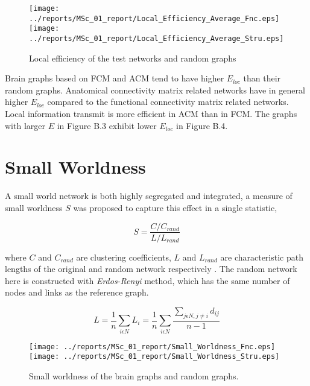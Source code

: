 \begin{figure}[htbp]
 
  \centering
	 \texttt{[image: ../reports/MSc\_01\_report/Local\_Efficiency\_Average\_Fnc.eps]}
	 \texttt{[image: ../reports/MSc\_01\_report/Local\_Efficiency\_Average\_Stru.eps]}
  \caption[Local Efficiency]{Local efficiency of the test networks and random graphs} 
    \label{fig:Local Efficiency}
 	
\end{figure}

Brain graphs based on FCM and ACM tend to have higher $E_{loc}$ than their random graphs. Anatomical connectivity matrix related networks have in general higher $E_{loc}$ compared to the functional connectivity matrix related networks. Local information transmit is more efficient in ACM than in FCM. The graphs with larger $E$ in Figure B.3 exhibit lower $E_{loc}$ in Figure B.4.   


\section{Small Worldness}

A small world network is both highly segregated and integrated, a measure of small worldness $S$ was proposed to capture this effect in a single statistic,

\begin{equation}
S = \frac{C/C_{rand}}{L/L_{rand}}
\end{equation}
 
where $C$ and $C_{rand}$ are clustering coefficients, $L$ and $L_{rand}$ are characteristic path lengths of the original and random network respectively \citep{HUM08}. The random network here is constructed with \textit{Erdos-Renyi} method, which has the same number of nodes and links as the reference graph. 

\begin{equation}
L = \frac{1}{n}\sum\limits_{i \epsilon N} L_i = \frac{1}{n}\sum\limits_{i \epsilon N} \frac{\sum\limits_{j \epsilon N, j \neq i }d_{ij}}{n-1 } 
\end{equation}


\begin{figure}[htbp]
 
  \centering
	 \texttt{[image: ../reports/MSc\_01\_report/Small\_Worldness\_Fnc.eps]}
	 \texttt{[image: ../reports/MSc\_01\_report/Small\_Worldness\_Stru.eps]}
  \caption[Small Worldness]{Small worldness of the brain graphs and random graphs.} 
    \label{fig:Small Worldness}
 	
\end{figure}


